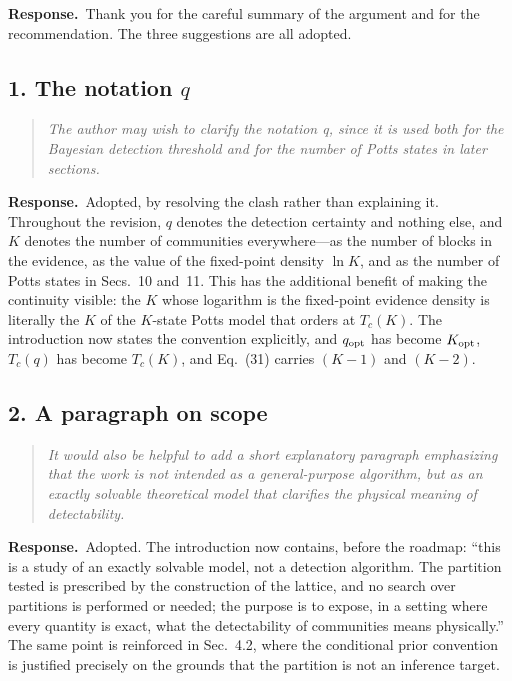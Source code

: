 \documentclass[11pt]{article}
\newenvironment{point}{\begin{quote}\itshape}{\end{quote}}
\newcommand{\reply}{\par\noindent\textbf{Response.}\ }
\begin{document}
\reply Thank you for the careful summary of the argument and for the
recommendation. The three suggestions are all adopted.

\subsection*{1. The notation $q$}

\begin{point}
The author may wish to clarify the notation q, since it is used both for the
Bayesian detection threshold and for the number of Potts states in later
sections.
\end{point}

\reply Adopted, by resolving the clash rather than explaining it. Throughout
the revision, $q$ denotes the detection certainty and nothing else, and $K$
denotes the number of communities everywhere---as the number of blocks in the
evidence, as the value of the fixed-point density $\ln K$, and as the number of
Potts states in Secs.~10 and~11. This has the additional benefit of making the
continuity visible: the $K$ whose logarithm is the fixed-point evidence density
is literally the $K$ of the $K$-state Potts model that orders at $T_c(K)$. The
introduction now states the convention explicitly, and $q_{\rm opt}$ has become
$K_{\rm opt}$, $T_c(q)$ has become $T_c(K)$, and Eq.~(31) carries $(K-1)$ and
$(K-2)$.

\subsection*{2. A paragraph on scope}

\begin{point}
It would also be helpful to add a short explanatory paragraph emphasizing that
the work is not intended as a general-purpose algorithm, but as an exactly
solvable theoretical model that clarifies the physical meaning of
detectability.
\end{point}

\reply Adopted. The introduction now contains, before the roadmap: ``this is a
study of an exactly solvable model, not a detection algorithm. The partition
tested is prescribed by the construction of the lattice, and no search over
partitions is performed or needed; the purpose is to expose, in a setting where
every quantity is exact, what the detectability of communities means
physically.'' The same point is reinforced in Sec.~4.2, where the conditional
prior convention is justified precisely on the grounds that the partition is
not an inference target.
\end{document}

